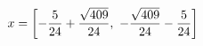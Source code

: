 \documentclass[preview]{standalone}
\begin{document}
\begin{align*}
\special{dvisvgm:raw <g id='unique000'>}x=\left[ - \frac{5}{24} + \frac{\sqrt{409}}{24}, \  - \frac{\sqrt{409}}{24} - \frac{5}{24}\right]\special{dvisvgm:raw </g>}
\end{align*}
\end{document}
